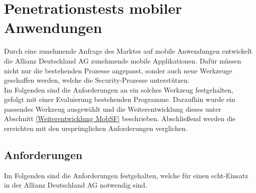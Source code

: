 \chapter{Penetrationstests mobiler Anwendungen}
Durch eine zunehmende Anfrage des Marktes auf mobile Anwendungen entwickelt die Allianz Deutschland AG zunehmende mobile Applikationen. Dafür müssen nicht nur die bestehenden Prozesse angepasst, sonder auch neue Werkzeuge geschaffen werden, welche die Security-Prozesse unterstützen.\\

Im Folgenden sind die Anforderungen an ein solches Werkzeug festgehalten, gefolgt mit einer Evaluierung bestehenden Programme. Daraufhin wurde ein passendes Werkzeug ausgewählt und die Weiterentwicklung dieses unter Abschnitt \ref{Weiterentwicklung MobSF} beschrieben. Abschließend werden die erreichten mit den ursprünglichen Anforderungen verglichen.

\section{Anforderungen}
Im Folgenden sind die Anforderungen festgehalten, welche für einen echt-Einsatz in der Allianz Deutschland AG notwendig sind.


